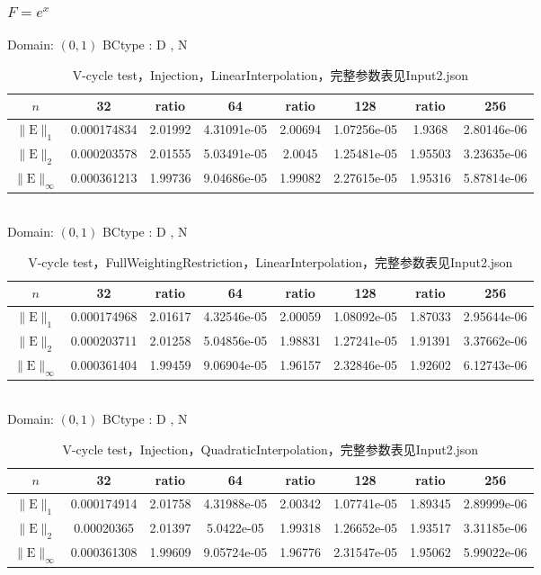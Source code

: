 \documentclass[a4paper,twoside]{ctexart}
\begin{document}
\newpage
\subsubsection{$F = e^x$}
\noindent Domain: $(0,1)$
BCtype : D , N
\begin{table}[htbp]
\centering\begin{tabular}{c|ccccccc}
\hline
$n$&32&ratio&64&ratio&128&ratio&256\\
\hline
$\|\mathrm{E}\|_1$&0.000174834&2.01992&4.31091e-05&2.00694&1.07256e-05&1.9368&2.80146e-06\\
\hline
$\|\mathrm{E}\|_2$&0.000203578&2.01555&5.03491e-05&2.0045&1.25481e-05&1.95503&3.23635e-06\\
\hline
$\|\mathrm{E}\|_{\infty}$&0.000361213&1.99736&9.04686e-05&1.99082&2.27615e-05&1.95316&5.87814e-06\\
\hline
\end{tabular}
\caption{V-cycle test，Injection，LinearInterpolation，完整参数表见Input2.json}
\end{table}\\

\noindent Domain: $(0,1)$
BCtype : D , N
\begin{table}[htbp]
\centering\begin{tabular}{c|ccccccc}
\hline
$n$&32&ratio&64&ratio&128&ratio&256\\
\hline
$\|\mathrm{E}\|_1$&0.000174968&2.01617&4.32546e-05&2.00059&1.08092e-05&1.87033&2.95644e-06\\
\hline
$\|\mathrm{E}\|_2$&0.000203711&2.01258&5.04856e-05&1.98831&1.27241e-05&1.91391&3.37662e-06\\
\hline
$\|\mathrm{E}\|_{\infty}$&0.000361404&1.99459&9.06904e-05&1.96157&2.32846e-05&1.92602&6.12743e-06\\
\hline
\end{tabular}
\caption{V-cycle test，FullWeightingRestriction，LinearInterpolation，完整参数表见Input2.json}
\end{table}\\

\noindent Domain: $(0,1)$
BCtype : D , N
\begin{table}[htbp]
\centering\begin{tabular}{c|ccccccc}
\hline
$n$&32&ratio&64&ratio&128&ratio&256\\
\hline
$\|\mathrm{E}\|_1$&0.000174914&2.01758&4.31988e-05&2.00342&1.07741e-05&1.89345&2.89999e-06\\
\hline
$\|\mathrm{E}\|_2$&0.00020365&2.01397&5.0422e-05&1.99318&1.26652e-05&1.93517&3.31185e-06\\
\hline
$\|\mathrm{E}\|_{\infty}$&0.000361308&1.99609&9.05724e-05&1.96776&2.31547e-05&1.95062&5.99022e-06\\
\hline
\end{tabular}
\caption{V-cycle test，Injection，QuadraticInterpolation，完整参数表见Input2.json}
\end{table}\\
\end{document}
